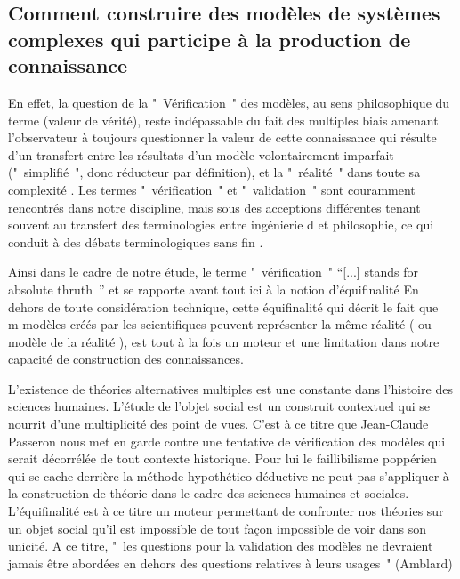 \subsection{Comment construire des modèles de systèmes complexes qui participe à la production de connaissance}

En effet, la question de la " Vérification " des modèles, au sens philosophique du terme (valeur de vérité), reste indépassable du fait des multiples biais amenant l'observateur à toujours questionner la valeur de cette connaissance qui résulte d'un transfert entre les résultats d'un modèle volontairement imparfait (" simplifié ", donc réducteur par définition), et la " réalité " dans toute sa complexité  \autocite{OSullivan2004}.  Les termes " vérification " et  " validation " sont couramment rencontrés dans notre discipline, mais sous des acceptions différentes tenant souvent au transfert des terminologies entre ingénierie \autocite{Sargent1984} d\autocite{Balci1998}  et philosophie, ce qui conduit à  des débats terminologiques sans fin \autocite{David2009}. 

Ainsi dans le cadre de notre étude, le terme " vérification "  \enquote{[...] stands for absolute thruth } \autocite{David2009} \autocite{Oreskes1994} et se rapporte avant tout ici à la notion d'équifinalité \autocite{OSullivan2004} En dehors de toute considération technique, cette équifinalité qui décrit le fait que m-modèles créés par les scientifiques peuvent représenter la même réalité ( ou modèle de la réalité ), est tout à la fois un moteur et une limitation dans notre capacité de construction des connaissances. 

L’existence de théories alternatives multiples est une constante dans l’histoire des sciences humaines. L'étude de l'objet social est un construit contextuel qui se nourrit d'une multiplicité des point de vues. C'est à ce titre que Jean-Claude Passeron \autocite{Passeron2006} nous met en garde contre une tentative de vérification des modèles qui serait décorrélée de tout contexte historique. Pour lui le faillibilisme poppérien qui se cache derrière la méthode hypothético déductive ne peut pas s'appliquer à la construction de théorie dans le cadre des sciences humaines et sociales. L'équifinalité est à ce titre un moteur permettant de confronter nos théories sur un objet social  qu'il est impossible de tout façon impossible de voir dans son unicité. A ce titre, " les questions pour  la validation des modèles ne devraient jamais être abordées en dehors des questions relatives à leurs usages " (Amblard)


